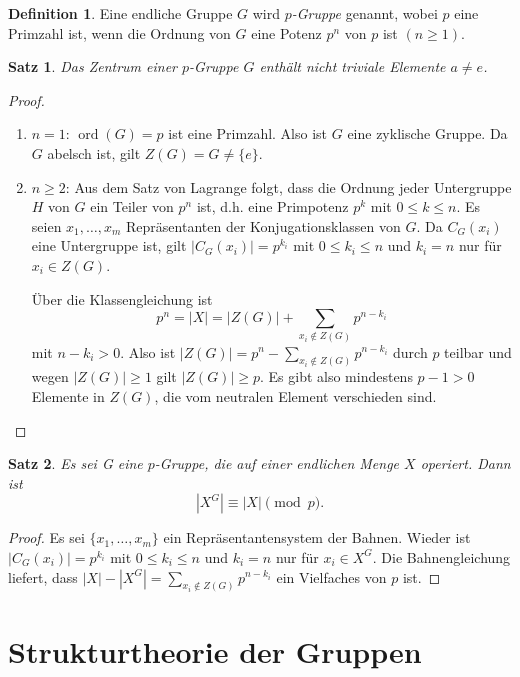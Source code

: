 \documentclass[12pt]{scrartcl} %
\DeclareMathOperator{\ord}{ord}
\newtheorem{thm}{Satz}[section]
\theoremstyle{definition}
\newtheorem*{defn}{Definition}
\theoremstyle{remark}
\newcommand{\defi}{\emph}
\begin{document}
\begin{defn}
	Eine endliche Gruppe \(G\) wird \defi{\(p\)-Gruppe} genannt, wobei \(p\) eine Primzahl ist, wenn die Ordnung von \(G\) eine Potenz $p^n$ von \(p\) ist $(n\geq 1)$.
\end{defn}

\begin{thm}
	Das Zentrum einer \(p\)-Gruppe \(G\) enthält nicht triviale Elemente $a \neq e$.
\end{thm}

\begin{proof}
	\begin{enumerate}
	\item \(n=1\): \(\ord(G)=p\) ist eine Primzahl.
		Also ist \(G\) eine zyklische Gruppe.
		Da \(G\) abelsch ist, gilt \(Z(G) = G \neq \{e\}\).
	\item \(n\geq 2\): Aus dem Satz von Lagrange folgt, dass die Ordnung jeder Untergruppe $H$ von $G$ ein Teiler von $p^n$ ist, d.h. eine Primpotenz $p^k$ mit $0\leq k\leq n$.
		Es seien $x_{1}, \dots ,x_{m}$ Repräsentanten der Konjugationsklassen von $G$.
		Da $C_{G}(x_{i})$ eine Untergruppe ist, gilt \(|C_{G}(x_{i})|=p^{k_i}\) mit $0\leq k_{i} \leq n$ und $k_{i}=n$ nur für $x_i \in Z(G)$.

		Über die Klassengleichung ist \[p^n=|X|=|Z(G)|+\sum_{x_{i}\notin Z(G)}p^{n-k_{i}}\] mit $n-k_{i}>0$.
		Also ist $|Z(G)|= p^n-\sum_{x_{i}\notin Z(G)}p^{n-k_{i}}$ durch \(p\) teilbar und wegen $|Z(G)|\geq 1$ gilt $|Z(G)|\geq p$.
		Es gibt also mindestens $p-1 > 0$ Elemente in $Z(G)$, die vom neutralen Element verschieden sind.\qedhere
\end{enumerate}
\end{proof}

\begin{thm}
	Es sei G eine $p$-Gruppe, die auf einer endlichen Menge $X$ operiert. Dann ist
	\begin{equation*}
		|X^G|\equiv |X| \pmod{p}.
	\end{equation*}
\end{thm}

\begin{proof}
	Es sei $\{x_{1}, \dots ,x_{m}\}$ ein Repräsentantensystem der Bahnen.
	Wieder ist $|C_{G}(x_{i})|=p^{k_i}$ mit $0\leq k_{i} \leq n$ und $k_{i}=n$ nur für $x_{i} \in X^G$.
	Die Bahnengleichung liefert, dass $|X|-|X^G|=\sum_{x_{i}\notin Z(G)}p^{n-k_{i}}$ ein Vielfaches von \(p\) ist.
\end{proof}

\section{Strukturtheorie der Gruppen}
\end{document}
